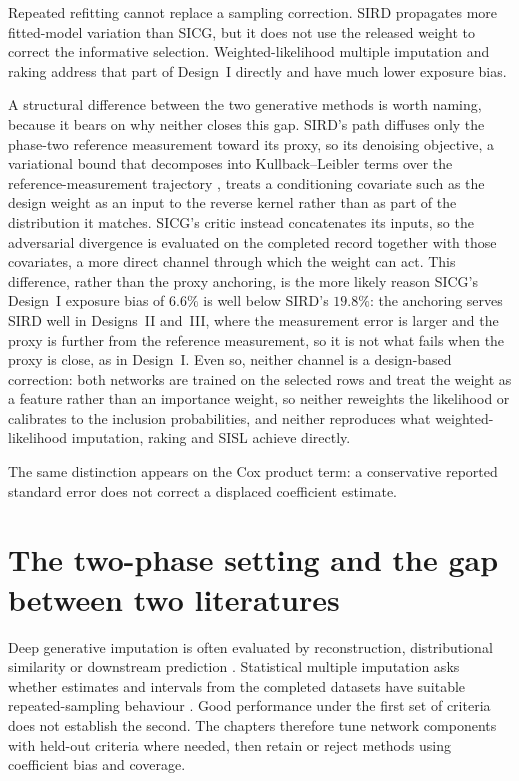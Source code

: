 Repeated refitting cannot replace a sampling correction. SIRD propagates more fitted-model variation than SICG, but it does not use the released weight to correct the informative selection. Weighted-likelihood multiple imputation and raking address that part of Design~I directly and have much lower exposure bias.

A structural difference between the two generative methods is worth naming, because it bears on why neither closes this gap. SIRD's path diffuses only the phase-two reference measurement toward its proxy, so its denoising objective, a variational bound that decomposes into Kullback--Leibler terms over the reference-measurement trajectory \citep{sohl-dickstein2015deep,ho2020denoising}, treats a conditioning covariate such as the design weight as an input to the reverse kernel rather than as part of the distribution it matches. SICG's critic instead concatenates its inputs, so the adversarial divergence \citep{goodfellow2014generative} is evaluated on the completed record together with those covariates, a more direct channel through which the weight can act. This difference, rather than the proxy anchoring, is the more likely reason SICG's Design~I exposure bias of $6.6\%$ is well below SIRD's $19.8\%$: the anchoring serves SIRD well in Designs~II and~III, where the measurement error is larger and the proxy is further from the reference measurement, so it is not what fails when the proxy is close, as in Design~I. Even so, neither channel is a design-based correction: both networks are trained on the selected rows and treat the weight as a feature rather than an importance weight, so neither reweights the likelihood or calibrates to the inclusion probabilities, and neither reproduces what weighted-likelihood imputation, raking and SISL achieve directly.

The same distinction appears on the Cox product term: a conservative reported standard error does not correct a displaced coefficient estimate.

\section{The two-phase setting and the gap between two literatures}
\label{sec:conc_gap}

Deep generative imputation is often evaluated by reconstruction, distributional similarity or downstream prediction \citep{yoon2018gain,tashiro2021csdi}. Statistical multiple imputation asks whether estimates and intervals from the completed datasets have suitable repeated-sampling behaviour \citep{Rubin1987,meng1994multiple,naf2023imputation}. Good performance under the first set of criteria does not establish the second. The chapters therefore tune network components with held-out criteria where needed, then retain or reject methods using coefficient bias and coverage.

